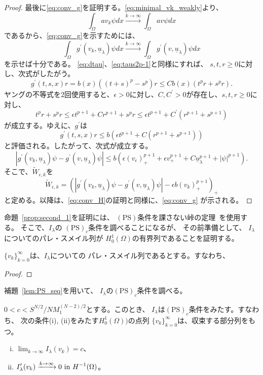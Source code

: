 \begin{proof}
 最後に\eqref{eq:conv_g}を証明する。\eqref{eq:minimal_vk_weakly}より、
 \[
  \int_\Omega a v_k \psi dx \xrightarrow{k \to \infty} \int_\Omega
 av\psi dx
 \]
 であるから、\eqref{eq:conv_g}を示すためには、
 \[
  \int_\Omega g^\prime(v_k, \underline{u}_\lambda)\psi dx \xrightarrow{
  k \to \infty } 
  \int_\Omega g^\prime(v, \underline{u}_\lambda)\psi dx
 \]
 を示せば十分である。
 \eqref{eq:dtau}、\eqref{eq:taus2p-1}と同様にすれば、
 $s, t, r \geq 0$に対し、次式がしたがう。
 \[
  g^\prime(t, s, x)r = b(x) \left( (t+s)^p - s^p \right) r \leq C b(x)
 \left( t^pr + s^p r \right).
 \]
 ヤングの不等式を$2$回使用すると、$\epsilon > 0$に対し、$C, C^\prime >
 0$が存在し、$s, t, r \geq 0$に対し、
 \[
  t^p r + s^p r \leq \epsilon t^{p+1} + C r^{p+1} + s^p r \leq
 \epsilon t^{p+1} + C^\prime (r^{p+1} + s^{p+1})
 \]
 が成立する。ゆえに、$g^\prime$は
 \[
  g^\prime(t, s, x)r \leq b \left( \epsilon t^{p+1} + C ( r^{p+1} +
 s^{p+1}) \right)
 \]
 と評価される。したがって、次式が成立する。
 \[  
  \left\lvert g^\prime(v_k, \underline{u}_\lambda)\psi - g^\prime(v,
   \underline{u}_\lambda)\psi \right\rvert \leq b \left( \epsilon
   (v_\epsilon)_+^{p+1}  + \epsilon v_+^{p+1} + C
   \underline{u}_\lambda^{p+1} + \lvert \psi \rvert^{p+1}
                                 \right).
 \]
 そこで、$\tilde{W}_{\epsilon, k}$を
\[  \tilde{W}_{\epsilon, k} = 
   \left( \left\lvert g^\prime(v_k, \underline{u}_\lambda)\psi - g^\prime(v,
    \underline{u}_\lambda)\psi \right\rvert
  -\epsilon b (v_k)_+^{p+1}
          \right)_+ \]
 と定める。以降は、\eqref{eq:conv_H}の証明と同様に、\eqref{eq:conv_g}
 が示される。\qedhere
\end{proof}

命題~\ref{prop:second_1}を証明には、
$(\mathrm{PS})$条件を課さない峠の定理~\cite{MR0370183}を使用する。
そこで、$I_\lambda$の
$(\mathrm{PS})_c$条件を調べることになるが、
その前準備として、
$I_\lambda$についてのパレ・スメイル列が
$H_0^1(\Omega)$の有界列であることを証明する。

\begin{lem} \label{lem:PS_seq}
 $\{ v_k \}_{k=0}^\infty$は、$I_\lambda$についての
 パレ・スメイル列であるとする。すなわち、
\end{lem}

\begin{proof}
 
\end{proof}

補題~\ref{lem:PS_seq}を用いて、
$I_\lambda$の$(\mathrm{PS})_c$条件を調べる。

\begin{lem}
 $0 < c < S^{N/2}/NM_1^{(N-2)/2}$とする。このとき、
 $I_\lambda$は$(\mathrm{PS})_c$条件をみたす。すなわち、
 次の条件(i), (ii)をみたす$H_0^1(\Omega))$の点列
 $\{ v_k \}_{k = 0}^\infty$は、収束する部分列をもつ。
 \begin{enumerate}[(i)]
  \item $\displaystyle \lim_{k \to \infty} I_\lambda (v_k) = c$、
  \item $\displaystyle I^\prime_\lambda (v_k) \xrightarrow{k \to
        \infty} 0 ~\text{in}~ H^{-1}(\Omega)$。
 \end{enumerate}
\end{lem}

